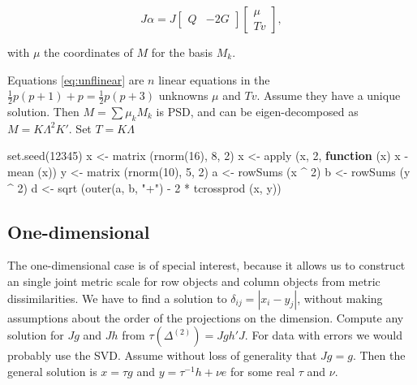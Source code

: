 \documentclass[
  12pt,
]{book}
\newenvironment{Shaded}{\begin{snugshade}}{\end{snugshade}}
\newcommand{\ControlFlowTok}[1]{\textcolor[rgb]{0.13,0.29,0.53}{\textbf{#1}}}
\newcommand{\DecValTok}[1]{\textcolor[rgb]{0.00,0.00,0.81}{#1}}
\newcommand{\FunctionTok}[1]{\textcolor[rgb]{0.00,0.00,0.00}{#1}}
\newcommand{\NormalTok}[1]{#1}
\newcommand{\OtherTok}[1]{\textcolor[rgb]{0.56,0.35,0.01}{#1}}
\newcommand{\SpecialCharTok}[1]{\textcolor[rgb]{0.00,0.00,0.00}{#1}}
\newcommand{\StringTok}[1]{\textcolor[rgb]{0.31,0.60,0.02}{#1}}
\theoremstyle{definition}
\theoremstyle{definition}
\theoremstyle{definition}
\theoremstyle{definition}
\theoremstyle{remark}
\begin{document}
\begin{equation}
J\alpha=J\begin{bmatrix}Q&-2G\end{bmatrix}\begin{bmatrix}\mu\\Tv\end{bmatrix},
\label{eq:unflinear}
\end{equation}

with \(\mu\) the coordinates of \(M\) for the basis \(M_k\).

Equations \eqref{eq:unflinear} are \(n\) linear equations in the \(\frac12 p(p+1)+p=\frac12 p(p+3)\) unknowns \(\mu\) and \(Tv\). Assume they have a unique solution.
Then \(M=\sum\mu_kM_k\) is PSD, and can be eigen-decomposed as \(M=K\Lambda^2 K'\).
Set \(T=K\Lambda\)

\begin{Shaded}
\begin{Highlighting}[]
\FunctionTok{set.seed}\NormalTok{(}\DecValTok{12345}\NormalTok{)}
\NormalTok{x }\OtherTok{\textless{}{-}} \FunctionTok{matrix}\NormalTok{ (}\FunctionTok{rnorm}\NormalTok{(}\DecValTok{16}\NormalTok{), }\DecValTok{8}\NormalTok{, }\DecValTok{2}\NormalTok{)}
\NormalTok{x }\OtherTok{\textless{}{-}} \FunctionTok{apply}\NormalTok{ (x, }\DecValTok{2}\NormalTok{, }\ControlFlowTok{function}\NormalTok{ (x) x }\SpecialCharTok{{-}} \FunctionTok{mean}\NormalTok{ (x))}
\NormalTok{y }\OtherTok{\textless{}{-}} \FunctionTok{matrix}\NormalTok{ (}\FunctionTok{rnorm}\NormalTok{(}\DecValTok{10}\NormalTok{), }\DecValTok{5}\NormalTok{, }\DecValTok{2}\NormalTok{)}
\NormalTok{a }\OtherTok{\textless{}{-}} \FunctionTok{rowSums}\NormalTok{ (x }\SpecialCharTok{\^{}} \DecValTok{2}\NormalTok{)}
\NormalTok{b }\OtherTok{\textless{}{-}} \FunctionTok{rowSums}\NormalTok{ (y }\SpecialCharTok{\^{}} \DecValTok{2}\NormalTok{)}
\NormalTok{d }\OtherTok{\textless{}{-}} \FunctionTok{sqrt}\NormalTok{ (}\FunctionTok{outer}\NormalTok{(a, b, }\StringTok{"+"}\NormalTok{) }\SpecialCharTok{{-}} \DecValTok{2} \SpecialCharTok{*} \FunctionTok{tcrossprod}\NormalTok{ (x, y))}
\end{Highlighting}
\end{Shaded}

\hypertarget{one-dimensional}{%
\subsection{One-dimensional}\label{one-dimensional}}

The one-dimensional case is of special interest, because it allows us to construct an
single joint metric scale for row objects and column objects from metric dissimilarities. We have to find a solution to \(\delta_{ij}=|x_i-y_j|\), without making assumptions about the order of the projections on the dimension. Compute any solution for \(Jg\) and \(Jh\) from \(\tau(\Delta^{(2)})=Jgh'J\). For data with errors we would probably use the SVD.
Assume without loss of generality that \(Jg=g\). Then the general solution is \(x=\tau g\) and \(y=\tau^{-1}h+\nu e\) for some real \(\tau\) and \(\nu\).
\end{document}
